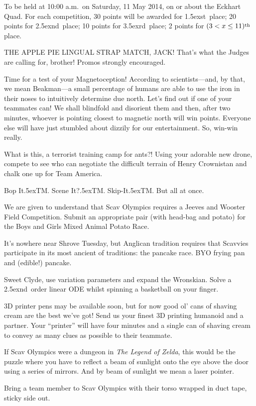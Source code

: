 \documentclass{book}
\def\th{\raise.5ex\hbox{\scriptsize th}}
\def\nd{\raise.5ex\hbox{\scriptsize nd}}
\def\st{\raise.5ex\hbox{\scriptsize st}}
\def\rd{\raise.5ex\hbox{\scriptsize rd}}
\def\tm{\raise.5ex\hbox{\scriptsize TM}}
\begin{document}
To be held at 10:00 a.m.\ on Saturday, 11 May 2014, on or about the Eckhart Quad.
For each competition, 30 points will be awarded for 1\st\ place; 20 points for
2\nd\ place; 10 points for 3\rd\ place; 2 points for $(3 < x \leq 11)\th\ $
place.  
\begin{list}{}{}

\item THE APPLE PIE LINGUAL STRAP MATCH, JACK! That's what the Judges are calling for, brother! Promos strongly encouraged.

\item Time for a test of your Magnetoception! According to scientists---and, by that, we mean Beakman---a small percentage of humans are able to use the iron in their noses to intuitively determine due north. Let's find out if one of your teammates can! We shall blindfold and disorient them and then, after two minutes, whoever is pointing closest to magnetic north will win points. Everyone else will have just stumbled about dizzily for our entertainment. So, win-win really. 

\item  What is this, a terrorist training camp for ants?! Using your adorable new drone, compete to see who can negotiate the difficult terrain of Henry Crownistan and chalk one up for Team America. 

\item Bop It\tm.  Scene It?\tm. Skip-It\tm.   But all at once. 

\item We are given to understand that Scav Olympics requires a Jeeves and Wooster Field Competition. Submit an appropriate pair (with head-bag and potato) for the Boys and Girls Mixed Animal Potato Race. 

\item It's nowhere near Shrove Tuesday, but  Anglican tradition requires that Scavvies participate in its most ancient of traditions: the pancake race. BYO frying pan and (edible!) pancake. 
\item Sweet Clyde, use variation parameters and expand the Wronskian. Solve a 2\nd\ order linear ODE whilst spinning a basketball on your finger.

\item 3D printer pens may be available soon, but for now good ol' cans of shaving cream are the best we've got!  Send us your finest 3D printing humanoid and a partner.  Your ``printer'' will have four minutes and a single can of shaving cream to convey as many clues as possible to their teammate.

\item If Scav Olympics were a dungeon in \emph{The Legend of Zelda}, this would be the puzzle where you have to reflect a beam of sunlight onto the eye above the door using a series of mirrors. And by beam of sunlight we mean a laser pointer.

\item Bring a team member to Scav Olympics with their torso wrapped in duct tape, sticky side out.


\end{list}
\end{document}
